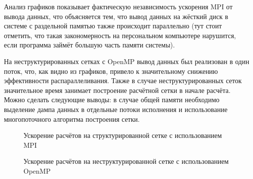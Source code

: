 Анализ графиков показывает фактическую независимость ускорения MPI от вывода данных, что объясняется тем, что вывод данных на жёсткий диск в системе с раздельной памятью также происходит параллельно (тут стоит отметить, что такая закономерность на персональном компьютере нарушится, если программа займёт большую часть памяти системы). 

На неструктурированных сетках с OpenMP вывод данных был реализован в один поток, что, как видно из графиков, привело к значительному снижению эффективности распараллеливания. Также в случае неструктурированных сеток значительное время занимает построение расчётной сетки в начале расчёта. Можно сделать следующие выводы: в случае общей памяти необходимо выделение дампа данных в отдельные потоки исполнения и использование многопоточного алгоритма построения сетки.

\begin{figure}[H]
	\caption{Ускорение расчётов на структурированной сетке с использованием MPI}
	\label{pic:mpi-perf}
\end{figure}

\begin{figure}[H]
	\caption{Ускорение расчётов на неструктурированной сетке с использованием OpenMP}
	\label{pic:omp-perf}
\end{figure}


















